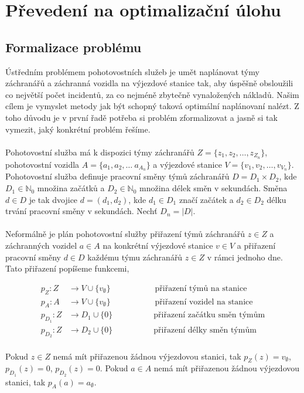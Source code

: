 \chapter{Převedení na optimalizační úlohu}

\section{Formalizace problému}

Ústředním problémem pohotovostních služeb je umět naplánovat týmy záchranářů a záchranná vozidla na výjezdové stanice tak, aby úspěšně obsloužili co největší počet incidentů,
za co nejméně zbytečně vynaložených nákladů.
Našim cílem je vymyslet metody jak být schopný taková optimální naplánovaní nalézt.
Z toho důvodu je v první řadě potřeba si problém zformalizovat a jasně si tak vymezit, jaký konkrétní problém řešíme.
\\
\\
Pohotovostní služba má k dispozici týmy záchranářů $Z = \{ z_1, z_2, \dots, z_{Z_n} \}$, pohotovostní vozidla $A = \{ a_1, a_2, \dots\ a_{A_n} \}$ a výjezdové stanice $V = \{ v_1, v_2, \dots, v_{V_n} \}$.
Pohotovostní služba definuje pracovní směny týmů záchranářů $D = D_{1} \times D_{2}$, 
kde $D_{1} \in \mathbb{N}_0$ množina začátků a $D_{2} \in \mathbb{N}_0$ množina délek směn v sekundách.
Směna $d \in D$ je tak dvojice $d = (d_1, d_2)$, kde $d_{1} \in D_{1}$ značí začátek a $d_{2} \in D_{2}$ délku trvání pracovní směny v sekundách.
Nechť $D_n = |D|$.
\\
\\
Neformálně je plán pohotovostní služby přiřazení týmů záchranářů $z \in Z$ a záchranných vozidel $a \in A$ na konkrétní výjezdové stanice $v \in V$
a přiřazení pracovní směny $d \in D$ každému týmu záchranářů $z \in Z$ v rámci jednoho dne.
Tato přiřazení popíšeme funkcemi, 

\begin{definice}
  \begin{align}
    p_Z \colon Z &\rightarrow V \cup \{ v_{\emptyset} \}                   \hspace{65pt} \text{přiřazení týmů na stanice} \\
    p_A \colon A &\rightarrow V \cup \{ v_{\emptyset} \}                   \hspace{65pt} \text{přiřazení vozidel na stanice} \\ 
    p_{D_{1}} \colon Z &\rightarrow D_{1} \cup \{ 0 \}         \hspace{60pt} \text{přiřazení začátku směn týmům} \\
    p_{D_{2}} \colon Z &\rightarrow D_{2} \cup \{ 0 \}         \hspace{60pt} \text{přiřazení délky směn týmům}
  \end{align}
  \\
  Pokud $z \in Z$ nemá mít přiřazenou žádnou výjezdovou stanici,
  tak $p_{Z}(z) = v_{\emptyset}$, $p_{D_{1}}(z) = 0$, $p_{D_{2}}(z) = 0$.
  Pokud $a \in A$ nemá mít přiřazenou žádnou výjezdovou stanici, tak $p_{A}(a) = a_{\emptyset}$.
\end{definice}

